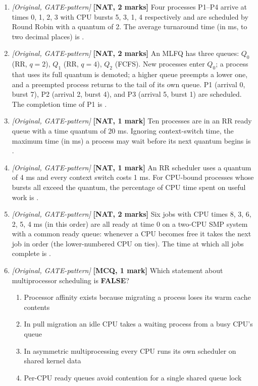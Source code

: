 \documentclass[11pt]{article}
\begin{document}
\begin{enumerate}
\item[\textbf{Q4}] \textit{[Original, GATE-pattern]} \textbf{[NAT, 2 marks]} Four processes P1--P4 arrive at times 0, 1, 2, 3 with CPU bursts 5, 3, 1, 4 respectively and are scheduled by Round Robin with a quantum of 2. The average turnaround time (in ms, to two decimal places) is \underline{\hspace{2cm}}.

\item[\textbf{Q5}] \textit{[Original, GATE-pattern]} \textbf{[NAT, 2 marks]} An MLFQ has three queues: $Q_0$ (RR, $q=2$), $Q_1$ (RR, $q=4$), $Q_2$ (FCFS). New processes enter $Q_0$; a process that uses its full quantum is demoted; a higher queue preempts a lower one, and a preempted process returns to the tail of its own queue. P1 (arrival 0, burst 7), P2 (arrival 2, burst 4), and P3 (arrival 5, burst 1) are scheduled. The completion time of P1 is \underline{\hspace{2cm}}.

\item[\textbf{Q6}] \textit{[Original, GATE-pattern]} \textbf{[NAT, 1 mark]} Ten processes are in an RR ready queue with a time quantum of 20 ms. Ignoring context-switch time, the maximum time (in ms) a process may wait before its next quantum begins is \underline{\hspace{2cm}}.

\item[\textbf{Q7}] \textit{[Original, GATE-pattern]} \textbf{[NAT, 1 mark]} An RR scheduler uses a quantum of 4 ms and every context switch costs 1 ms. For CPU-bound processes whose bursts all exceed the quantum, the percentage of CPU time spent on useful work is \underline{\hspace{2cm}}.

\item[\textbf{Q8}] \textit{[Original, GATE-pattern]} \textbf{[NAT, 2 marks]} Six jobs with CPU times 8, 3, 6, 2, 5, 4 ms (in this order) are all ready at time 0 on a two-CPU SMP system with a common ready queue: whenever a CPU becomes free it takes the next job in order (the lower-numbered CPU on ties). The time at which all jobs complete is \underline{\hspace{2cm}}.

\item[\textbf{Q9}] \textit{[Original, GATE-pattern]} \textbf{[MCQ, 1 mark]} Which statement about multiprocessor scheduling is \textbf{FALSE}?
\begin{enumerate}
  \item[(A)] Processor affinity exists because migrating a process loses its warm cache contents
  \item[(B)] In pull migration an idle CPU takes a waiting process from a busy CPU's queue
  \item[(C)] In asymmetric multiprocessing every CPU runs its own scheduler on shared kernel data
  \item[(D)] Per-CPU ready queues avoid contention for a single shared queue lock
\end{enumerate}
\end{enumerate}
\end{document}
